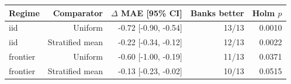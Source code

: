 \begin{tabular}{lrrrr}
\toprule
Regime & Comparator & $\Delta$ MAE [95\% CI] & Banks better & Holm $p$ \\
\midrule
iid & Uniform & -0.72 [-0.90, -0.54] & 13/13 & 0.0010 \\
iid & Stratified mean & -0.22 [-0.34, -0.12] & 12/13 & 0.0022 \\
frontier & Uniform & -0.60 [-1.00, -0.19] & 11/13 & 0.0371 \\
frontier & Stratified mean & -0.13 [-0.23, -0.02] & 10/13 & 0.0515 \\
\bottomrule
\end{tabular}
